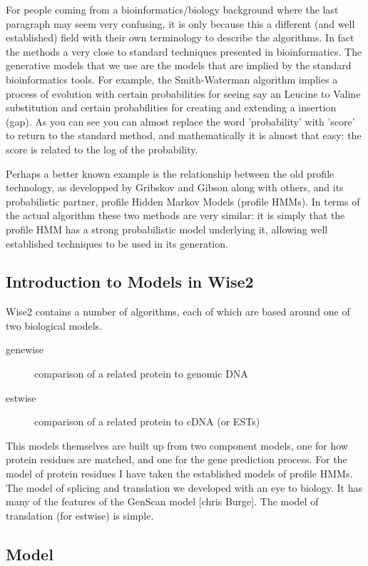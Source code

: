 \documentclass{article}
\begin{document}
For people coming from a bioinformatics/biology background where the last
paragraph may seem very confusing, it is only because this a different
(and well established) field with their own terminology to describe the
algorithms. In fact the methods a very close to standard techniques presented
in bioinformatics. The generative models that we
use are the models that are implied by the standard bioinformatics
tools. For example, the Smith-Waterman algorithm implies a process of
evolution with certain probabilities for seeing say an Leucine to  Valine
substitution and certain probabilities for creating and extending a
insertion (gap). As you can see you can almost replace the word
'probability' with 'score' to return to the standard method, and
mathematically it is almost that easy: the score is related to the log
of the probability.

Perhaps a better known example is the relationship between the old
profile technology, as developped by Gribskov and Gibson along with
others, and its probabilistic partner, profile Hidden Markov Models
(profile HMMs).  In terms of the actual algorithm these two methods
are very similar: it is simply that the profile HMM has a strong
probabilistic model underlying it, allowing well established
techniques to be used in its generation.

\subsection{Introduction to Models in Wise2}
Wise2 contains a number of algorithms, each of which are based around
one of two biological models.

\begin{description}
\item[genewise] comparison of a related protein to genomic DNA
\item[estwise] comparison of a related protein to cDNA (or ESTs)
\end{description}

This models themselves are built up from two component models, one for how
protein residues are matched, and one for the gene prediction process. For the model
of protein residues I have taken the established models of profile HMMs.
The model of splicing and translation we developed with an eye to biology.
It has many of the features of the GenScan model [chris Burge]. The model
of translation (for estwise) is simple.

\subsection{Model}
\end{document}
